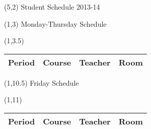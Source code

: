 \documentclass [] {report}
\begin{document}
\begin{textblock}{10}(5,2)
{\Huge Student Schedule 2013-14}\\

\end{textblock}



\begin{textblock}{10}(1,3)
\huge
Monday-Thursday Schedule
\end{textblock}

\begin{textblock}{5}(1,3.5)
\Large
\begin{tabular}{l l l l}
\bf{Period} & \bf{Course} & \bf{Teacher} & \bf{Room} \\
\hline
\end{tabular}
\end{textblock}


\begin{textblock}{10}(1,10.5)
\huge
Friday Schedule
\end{textblock}

\begin{textblock}{5}(1,11)
\Large
\begin{tabular}{l l l l}
\bf{Period} & \bf{Course} & \bf{Teacher} & \bf{Room} \\
\hline
\end{tabular}
\end{textblock}
\end{document}
